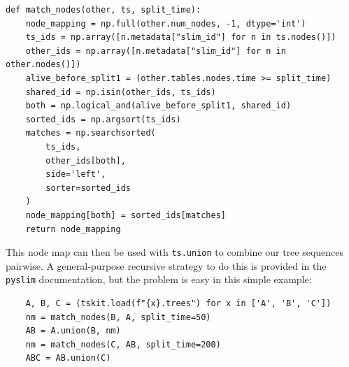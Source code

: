 \documentclass[12pt]{article}
\newcommand{\pyslim}[0]{\texttt{pyslim}\xspace}
\begin{document}
\begin{verbatim}
def match_nodes(other, ts, split_time):
    node_mapping = np.full(other.num_nodes, -1, dtype='int')
    ts_ids = np.array([n.metadata["slim_id"] for n in ts.nodes()])
    other_ids = np.array([n.metadata["slim_id"] for n in other.nodes()])
    alive_before_split1 = (other.tables.nodes.time >= split_time)
    shared_id = np.isin(other_ids, ts_ids)
    both = np.logical_and(alive_before_split1, shared_id)
    sorted_ids = np.argsort(ts_ids)
    matches = np.searchsorted(
        ts_ids,
        other_ids[both],
        side='left',
        sorter=sorted_ids
    )
    node_mapping[both] = sorted_ids[matches]
    return node_mapping
\end{verbatim}
This node map can then be used with \verb|ts.union| to combine our tree sequences pairwise.
A general-purpose recursive strategy to do this is provided in the \pyslim documentation,
but the problem is easy in this simple example:
\begin{verbatim}
    A, B, C = (tskit.load(f"{x}.trees") for x in ['A', 'B', 'C'])
    nm = match_nodes(B, A, split_time=50)
    AB = A.union(B, nm)
    nm = match_nodes(C, AB, split_time=200)
    ABC = AB.union(C)
\end{verbatim}
% 
% 
\end{document}
